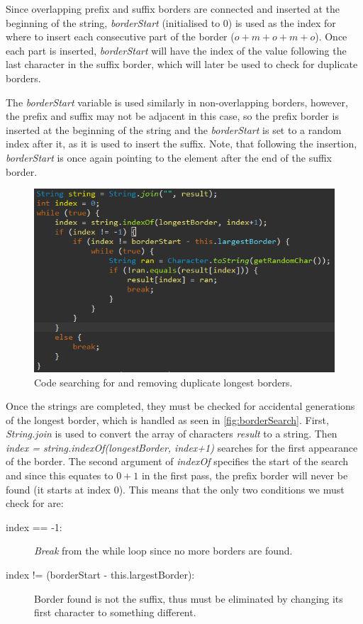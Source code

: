 \documentclass{l4proj}
\begin{document}
Since overlapping prefix and suffix borders are connected and inserted at the beginning of the string, \emph{borderStart} (initialised to $0$) is used as the index for where to insert each consecutive part of the border ($o+m+o+m+o$). Once each part is inserted, \emph{borderStart} will have the index of the value following the last character in the suffix border, which will later be used to check for duplicate borders.

The \emph{borderStart} variable is used similarly in non-overlapping borders, however, the prefix and suffix may not be adjacent in this case, so the prefix border is inserted at the beginning of the string and the \emph{borderStart} is set to a random index after it, as it is used to insert the suffix. Note, that following the insertion, \emph{borderStart} is once again pointing to the element after the end of the suffix border.

\begin{figure}
    \centering
    \includegraphics[width=0.7\linewidth]{images/borderSearch.png}    

    \caption{Code searching for and removing duplicate longest borders.}
    \label{fig:borderSearch} 
\end{figure}

Once the strings are completed, they must be checked for accidental generations of the longest border, which is handled as seen in \autoref{fig:borderSearch}. First, \emph{String.join} is used to convert the array of characters \emph{result} to a string. Then \emph{index = string.indexOf(longestBorder, index+1)} searches for the first appearance of the border. The second argument of \emph{indexOf} specifies the start of the search and since this equates to $0+1$ in the first pass, the prefix border will never be found (it starts at index $0$). This means that the only two conditions we must check for are:

\begin{description}
	\item[index == -1:]
 	\emph{Break} from the while loop since no more borders are found.
	\item[index != (borderStart - this.largestBorder):] 
	Border found is not the suffix, thus must be eliminated by changing its first character to something different.
\end{description}
\end{document}
